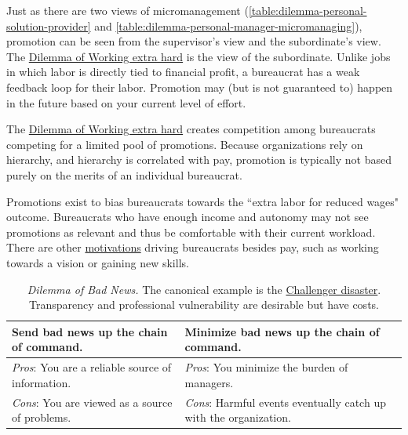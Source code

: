 Just as there are two views of micromanagement (\ref{table:dilemma-personal-solution-provider} and \ref{table:dilemma-personal-manager-micromanaging}), promotion can be seen from the supervisor's view and the subordinate's view. The \hyperref[table:dilemma-personal-work-extra-or-work-as-expected]{Dilemma of Working extra hard} is the view of the subordinate. Unlike jobs in which labor is directly tied to financial profit, a bureaucrat has a weak feedback loop for their labor. Promotion may (but is not guaranteed to) happen in the future based on your current level of effort. 

The \hyperref[table:dilemma-personal-work-extra-or-work-as-expected]{Dilemma of Working extra hard} creates competition among bureaucrats competing for a limited pool of promotions. Because organizations rely on hierarchy, and hierarchy is correlated with pay, promotion is typically not based purely on the merits of an individual bureaucrat. 

Promotions exist to bias bureaucrats towards the ``extra labor for reduced wages" outcome. Bureaucrats who have enough income and autonomy may not see promotions as relevant and thus be comfortable with their current workload. There are other 
\hyperref[sec:motivations]{motivations} 
driving bureaucrats besides pay, such as working towards a vision or gaining new skills. 

\begin{center}
\begin{table}[H] %
\begin{tabular}{ | m{\dilemmatablewidth}| m{\dilemmatablewidth} | } 
  \hline
  \textbf{Send bad news up the chain of command.} &
  \textbf{Minimize bad news up the chain of command.} \\
  \hline
  \textit{Pros}: You are a reliable source of information. &
  \textit{Pros}: You minimize the burden of managers. \\
  \hline
  \textit{Cons}: You are viewed as a source of problems. & 
  \textit{Cons}: Harmful events eventually catch up with the organization.  \\
  \hline
\end{tabular}
\caption{\textit{Dilemma of Bad News.}
The canonical example is the \href{https://en.wikipedia.org/wiki/Space_Shuttle_Challenger_disaster}{Challenger disaster}. 
Transparency and professional vulnerability are desirable but have costs.}
\label{table:dilemma-personal-bad-news-up-the-chain}
\end{table}
\end{center}


